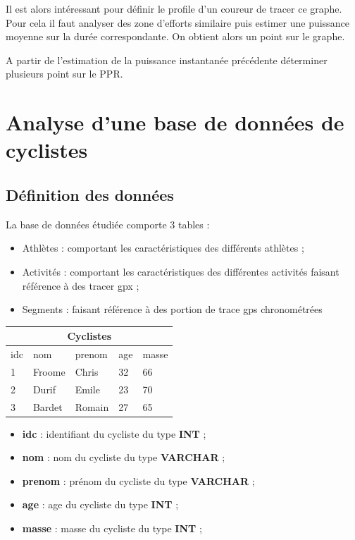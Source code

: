 Il est alors intéressant pour définir le profile d'un coureur de tracer ce graphe. Pour cela il faut analyser des zone d'efforts similaire puis estimer une puissance moyenne sur la durée correspondante. On obtient alors un point sur le graphe.

\question{} A partir de l'estimation de la puissance instantanée précédente déterminer plusieurs point sur le PPR.

\section{Analyse d'une base de données de cyclistes}

\subsection{Définition des données}

La base de données étudiée comporte 3 tables : 
\begin{itemize}
\item Athlètes : comportant les caractéristiques des différents athlètes ;
\item Activités : comportant les caractéristiques des différentes activités faisant référence à des tracer gpx ;
\item Segments : faisant référence à des portion de trace gps chronométrées
\end{itemize}

\begin{minipage}{0.5\textwidth}
\begin{center}
\begin{tabular}{lllll}
\toprule
\multicolumn{5}{c}{Cyclistes}\\
\midrule
idc & nom & prenom & age & masse\\
\midrule
1&Froome&Chris&32 & 66 \\
2&Durif&Emile&23 & 70 \\
3&Bardet&Romain&27 & 65 \\
\bottomrule
\end{tabular}
\end{center}
\end{minipage}
\begin{minipage}{0.5\textwidth}
\begin{itemize}
\item \textbf{idc} : identifiant du cycliste du type \textbf{INT} ;
\item \textbf{nom} : nom du cycliste du type \textbf{VARCHAR} ;
\item \textbf{prenom} : prénom du cycliste du type \textbf{VARCHAR} ;
\item \textbf{age} : age du cycliste du type \textbf{INT} ;
\item \textbf{masse} : masse du cycliste du type \textbf{INT} ;
\end{itemize}
\end{minipage}


